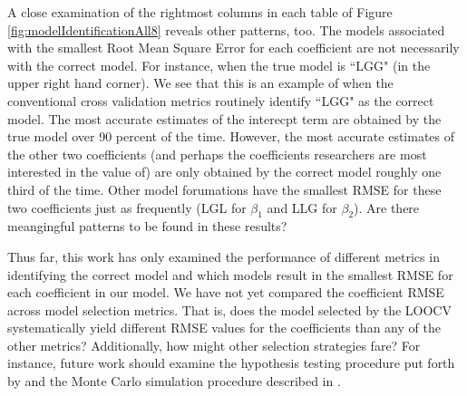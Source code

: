 \documentclass{article}\usepackage[]{graphicx}\usepackage[]{color}
\begin{document}
A close examination of the rightmost columns in each table of Figure \ref{fig:modelIdentificationAll8} reveals other patterns, too. The models associated with the smallest Root Mean Square Error for each coefficient are not necessarily with the correct model. For instance, when the true model is ``LGG" (in the upper right hand corner). We see that this is an example of when the conventional cross validation metrics routinely identify ``LGG" as the correct model. The most accurate estimates of the interecpt term are obtained by the true model over 90 percent of the time. However, the most accurate estimates of the other two coefficients (and perhaps the coefficients researchers are most interested in the value of) are only obtained by the correct model roughly one third of the time. Other model forumations have the smallest RMSE for these two coefficients just as frequently (LGL for $\beta _1$ and LLG for $\beta _2$). Are there meangingful patterns to be found in these results?

Thus far, this work has only examined the performance of different metrics in identifying the correct model and which models result in the smallest RMSE for each coefficient in our model. We have not yet compared the coefficient RMSE across model selection metrics. That is, does the model selected by the LOOCV systematically yield different RMSE values for the coefficients than any of the other metrics? Additionally, how might other selection strategies fare? For instance, future work should examine the hypothesis testing procedure put forth by \citet{Leung2000a} and the Monte Carlo simulation procedure described in \citet{Fotheringham2002}. 








% 
\end{document}
